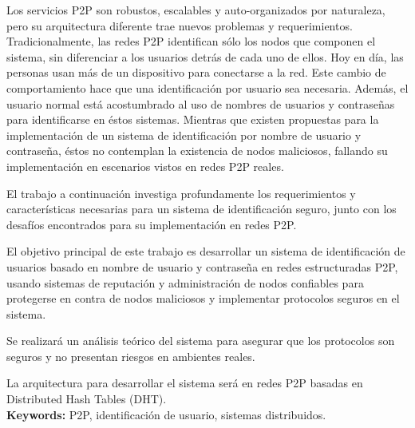 Los servicios P2P son robustos, escalables y auto-organizados por naturaleza,
pero su arquitectura diferente trae nuevos problemas y requerimientos.
Tradicionalmente, las redes P2P identifican sólo los nodos que componen el
sistema, sin diferenciar a los usuarios detrás de cada uno de ellos.
Hoy en día, las personas usan más de un dispositivo para conectarse a la red.
Este cambio de comportamiento hace que una identificación por usuario sea
necesaria. Además, el usuario normal está acostumbrado al uso de nombres de
usuarios y contraseñas para identificarse en éstos sistemas.
Mientras que existen propuestas para la implementación de un sistema de
identificación por nombre de usuario y contraseña, éstos no contemplan la
existencia de nodos maliciosos, fallando su implementación en escenarios vistos
en redes P2P reales.

El trabajo a continuación investiga profundamente los requerimientos y
características necesarias para un sistema de identificación seguro, junto con
los desafíos encontrados para su implementación en redes P2P.

El objetivo principal de este trabajo es desarrollar un sistema de
identificación de usuarios basado en nombre de usuario y contraseña en redes
estructuradas P2P, usando sistemas de reputación y administración de nodos
confiables para protegerse en contra de nodos maliciosos y implementar protocolos seguros
en el sistema.

Se realizará un análisis teórico del sistema para asegurar que los protocolos
son seguros y no presentan riesgos en ambientes reales.

La arquitectura para desarrollar el sistema será en redes P2P basadas en  Distributed Hash
Tables (DHT).\\

{\bf Keywords:} P2P, identificación de usuario, sistemas distribuidos.
